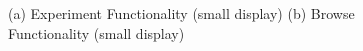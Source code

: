 \documentclass[11pt,a4paper,english]{scrreprt}
\begin{document}
\begin{figure}
    \centering
    \caption{(a) Experiment Functionality (small display) (b) Browse Functionality (small display)}
    \label{fig:samples_s_experiment_browse}
\end{figure}
\end{document}
